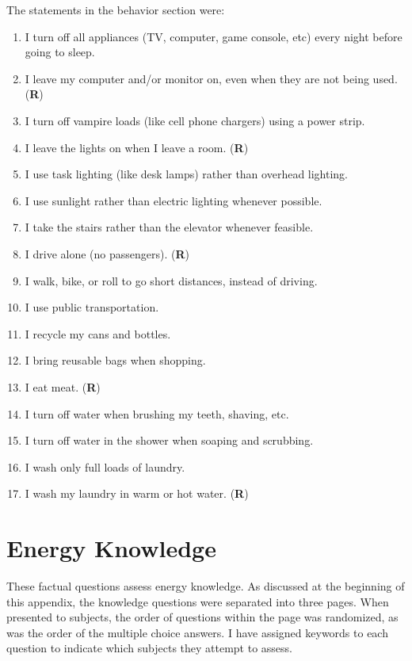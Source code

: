 The statements in the behavior section were:

\begin{enumerate}
	\item I turn off all appliances (TV, computer, game console, etc) every night before going to sleep.
	\item I leave my computer and/or monitor on, even when they are not being used. (\textbf{R})
	\item I turn off vampire loads (like cell phone chargers) using a power strip.
	\item I leave the lights on when I leave a room. (\textbf{R})
	\item I use task lighting (like desk lamps) rather than overhead lighting.
	\item I use sunlight rather than electric lighting whenever possible.
	\item I take the stairs rather than the elevator whenever feasible.
	\item I drive alone (no passengers). (\textbf{R})
	\item I walk, bike, or roll to go short distances, instead of driving.
	\item I use public transportation.
	\item I recycle my cans and bottles.
	\item I bring reusable bags when shopping.
	\item I eat meat. (\textbf{R})
	\item I turn off water when brushing my teeth, shaving, etc.
	\item I turn off water in the shower when soaping and scrubbing.
	\item I wash only full loads of laundry.
	\item I wash my laundry in warm or hot water. (\textbf{R})
\end{enumerate}


\section{Energy Knowledge}
\label{sec:knowledge-items}

These factual questions assess energy knowledge. As discussed at the beginning of this appendix, the knowledge questions were separated into three pages. When presented to subjects, the order of questions within the page was randomized, as was the order of the multiple choice answers. I have assigned keywords to each question to indicate which subjects they attempt to assess.

